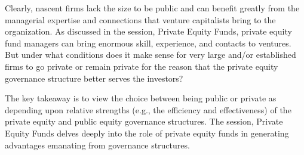 \documentclass[11pt]{article}
\begin{document}
Clearly, nascent firms lack the size to be public and can benefit greatly from the managerial expertise and connections that venture capitalists bring to the organization. As discussed in the session, Private Equity Funds, private equity fund managers can bring enormous skill, experience, and contacts to ventures. But under what conditions does it make sense for very large and/or established firms to go private or remain private for the reason that the private equity governance structure better serves the investors?

The key takeaway is to view the choice between being public or private as depending upon relative strengths (e.g., the efficiency and effectiveness) of the private equity and public equity governance structures. The session, Private Equity Funds delves deeply into the role of private equity funds in generating advantages emanating from governance structures.
\end{document}
